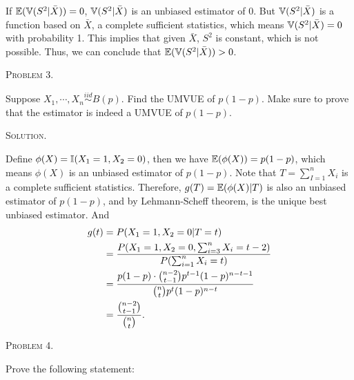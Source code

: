 \documentclass{article}
\begin{document}
\begin{CJK}{UTF8}{gbsn}
\begin{itemize}
              \noindent If ${\mathbb E}({\mathbb V}(S^2|\bar{X})) = 0$, ${\mathbb V}(S^2|\bar{X})$ is an unbiased estimator of 0. But
              ${\mathbb V}(S^2|\bar{X})$ is a function based on $\bar{X}$, a complete sufficient statistics, which means
              ${\mathbb V}(S^2|\bar{X}) = 0$ with probability 1. This implies that given $\bar{X}$, $S^2$ is constant, which is not possible.
              Thus, we can conclude that ${\mathbb E}({\mathbb V}(S^2|\bar{X})) > 0$.

    \end{itemize}


    \begin{shaded}
        \noindent\textsc{Problem 3.}\par
        Suppose $X_1, \cdots, X_n\mathop{\sim}\limits^{iid} B(p)$. Find the UMVUE of $p(1-p)$. Make
        sure to prove that the estimator is indeed a UMVUE of $p(1-p)$.
    \end{shaded}
    \noindent\textsc{Solution.}\par
    Define $\phi(X)={\mathbb I}(X_1=1, X_2=0)$, then we have ${\mathbb E}(\phi(X))=p(1-p)$, which means $\phi(X)$ is an unbiased
    estimator of $p(1-p)$. Note that $T=\sum_{I=1}^n X_i$ is a complete sufficient statistics. Therefore, $g(T) = {\mathbb E}(\phi(X)|T)$
    is also an unbiased estimator of $p(1-p)$, and by Lehmann-Scheff theorem, is the unique best unbiased estimator.
    And
    \begin{align}
        g(t) & =P(X_1=1, X_2=0 | T=t) \notag                                                                  \\
             & = \frac{P(X_1=1, X_2=0, \sum_{i=3}^n X_i = t-2)}{P(\sum_{i=1}^n X_i = t)} \notag               \\
             & = \frac{p(1-p) \cdot \binom{n-2}{t-1}p^{t-1}(1-p)^{n-t-1}}{\binom{n}{t}p^{t}(1-p)^{n-t}}\notag \\
             & =\frac{\binom{n-2}{t-1}}{\binom{n}{t}}.\notag
    \end{align}





    \begin{shaded}
        \noindent\textsc{Problem 4.}\par
        Prove the following statement:


\end{shaded}
\end{CJK}
\end{document}
